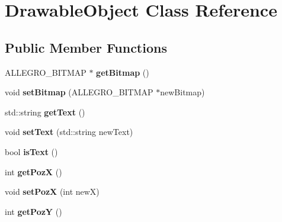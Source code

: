 \hypertarget{classDrawableObject}{}\section{Drawable\+Object Class Reference}
\label{classDrawableObject}
\subsection*{Public Member Functions}
\begin{DoxyCompactItemize}
\item 
A\+L\+L\+E\+G\+R\+O\+\_\+\+B\+I\+T\+M\+AP $\ast$ {\bfseries get\+Bitmap} ()\hypertarget{classDrawableObject_a24589e56097b354e54daff2351ef8646}{}\label{classDrawableObject_a24589e56097b354e54daff2351ef8646}

\item 
void {\bfseries set\+Bitmap} (A\+L\+L\+E\+G\+R\+O\+\_\+\+B\+I\+T\+M\+AP $\ast$new\+Bitmap)\hypertarget{classDrawableObject_af24ffb9aa05616ecfe7a91076e4ef9f1}{}\label{classDrawableObject_af24ffb9aa05616ecfe7a91076e4ef9f1}

\item 
std\+::string {\bfseries get\+Text} ()\hypertarget{classDrawableObject_a10c3b5011225e6336609f7fa1a5081cc}{}\label{classDrawableObject_a10c3b5011225e6336609f7fa1a5081cc}

\item 
void {\bfseries set\+Text} (std\+::string new\+Text)\hypertarget{classDrawableObject_aa1cfa32a445847c11f08e8d730908dee}{}\label{classDrawableObject_aa1cfa32a445847c11f08e8d730908dee}

\item 
bool {\bfseries is\+Text} ()\hypertarget{classDrawableObject_ae635cb4eeca6c33ee243f00004a920a2}{}\label{classDrawableObject_ae635cb4eeca6c33ee243f00004a920a2}

\item 
int {\bfseries get\+PozX} ()\hypertarget{classDrawableObject_af22b9de5fd585984890a84266ffd4e82}{}\label{classDrawableObject_af22b9de5fd585984890a84266ffd4e82}

\item 
void {\bfseries set\+PozX} (int newX)\hypertarget{classDrawableObject_ae7d27907929ab4536882b2a8eed38758}{}\label{classDrawableObject_ae7d27907929ab4536882b2a8eed38758}

\item 
int {\bfseries get\+PozY} ()\hypertarget{classDrawableObject_af777ba956aa537c2010503e7afd9c989}{}\label{classDrawableObject_af777ba956aa537c2010503e7afd9c989}


\end{DoxyCompactItemize}
